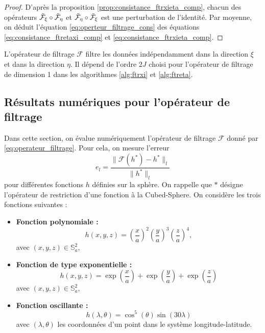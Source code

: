\begin{proof}
D'après la proposition \ref{prop:consistance_ftrxieta_comp}, chacun des opérateurs $\tilde{\mathcal{F}}_{\xi} \circ \tilde{\mathcal{F}}_{\eta}$ et $\tilde{\mathcal{F}}_{\eta} \circ \tilde{\mathcal{F}}_{\xi}$ est une perturbation de l'identité.
Par moyenne, on déduit l'équation \eqref{eq:operteur_filtrage_cons} des équations \eqref{eq:consistance_ftretaxi_comp} et \eqref{eq:consistance_ftrxieta_comp}.
\end{proof}

L'opérateur de filtrage $\mathcal{F}$ filtre les données indépendamment dans la direction $\xi$ et dans la direction $\eta$. Il dépend de l'ordre $2J$ choisi pour l'opérateur de filtrage de dimension 1 dans les algorithmes \ref{alg:ftrxi} et \ref{alg:ftreta}.














\subsection{Résultats numériques pour l'opérateur de filtrage}

Dans cette section, on évalue numériquement l'opérateur de filtrage $\mathcal{F}$ donné par \eqref{eq:operateur_filtrage}. Pour cela, on mesure l'erreur
\begin{equation}
e_l = \dfrac{\| \mathcal{F}(h^*) - h^* \|_l}{\| h^* \|_l}
\end{equation}
pour différentes fonctions $h$ définies sur la sphère. On rappelle que $*$ désigne l'opérateur de restriction d'une fonction à la Cubed-Sphere. On considère les trois fonctions suivantes :

\begin{itemize}
\item \textbf{Fonction polynomiale :} 
\begin{equation}
h(x,y,z)=\left( \dfrac{x}{a} \right)^2  \left( \dfrac{y}{a} \right)^3 \left( \dfrac{z}{a} \right)^4,
\label{eq:fct_test1}
\end{equation}
avec $(x,y,z) \in \mathbb{S}_a^2$,

\item \textbf{Fonction de type exponentielle :}
\begin{equation}
h(x,y,z)=\exp \left( \dfrac{x}{a} \right) + \exp \left( \dfrac{y}{a} \right) + \exp \left( \dfrac{z}{a} \right)
\label{eq:fct_test2}
\end{equation}
avec $(x,y,z) \in \mathbb{S}_a^2$,

\item \textbf{Fonction oscillante :}
\begin{equation}
h(\lambda, \theta)= \cos^5 (\theta) \sin ( 30 \lambda)
\label{eq:fct_test3}
\end{equation}
avec $(\lambda, \theta)$ les coordonnées d'un point dans le système longitude-latitude.
\end{itemize}

